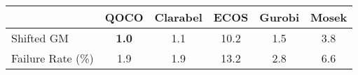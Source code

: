 \begin{tabular}{lccccc}
  \hline
   & \textbf{QOCO} & \textbf{Clarabel} & \textbf{ECOS} & \textbf{Gurobi} & \textbf{Mosek} \\ \hline
  Shifted GM & \textbf{1.0} & 1.1 & 10.2 & 1.5 & 3.8 \\ 
  Failure Rate (\%) & 1.9 & 1.9 & 13.2 & 2.8 & 6.6 \\ \hline 
\end{tabular}
